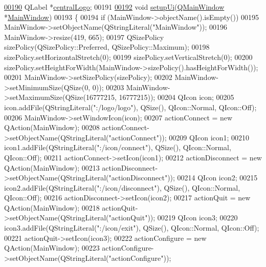 \begin{DoxyCode}
\hypertarget{a00052_source_l00190}{}\hyperlink{a00027_ab5c037236f041a2a7753d3e4efd3d0e8}{00190}     QLabel *\hyperlink{a00027_ab5c037236f041a2a7753d3e4efd3d0e8}{centralLogo};
00191 
\hypertarget{a00052_source_l00192}{}\hyperlink{a00027_acf4a0872c4c77d8f43a2ec66ed849b58}{00192}     \textcolor{keywordtype}{void} \hyperlink{a00027_acf4a0872c4c77d8f43a2ec66ed849b58}{setupUi}(\hyperlink{a00010}{QMainWindow} *\hyperlink{a00006}{MainWindow})
00193     \{
00194         \textcolor{keywordflow}{if} (MainWindow->objectName().isEmpty())
00195             MainWindow->setObjectName(QStringLiteral(\textcolor{stringliteral}{"MainWindow"}));
00196         MainWindow->resize(419, 665);
00197         QSizePolicy sizePolicy(QSizePolicy::Preferred, QSizePolicy::Maximum);
00198         sizePolicy.setHorizontalStretch(0);
00199         sizePolicy.setVerticalStretch(0);
00200         sizePolicy.setHeightForWidth(MainWindow->sizePolicy().hasHeightForWidth());
00201         MainWindow->setSizePolicy(sizePolicy);
00202         MainWindow->setMinimumSize(QSize(0, 0));
00203         MainWindow->setMaximumSize(QSize(16777215, 16777215));
00204         QIcon icon;
00205         icon.addFile(QStringLiteral(\textcolor{stringliteral}{":/logo/logo"}), QSize(), QIcon::Normal, QIcon::Off);
00206         MainWindow->setWindowIcon(icon);
00207         actionConnect = \textcolor{keyword}{new} QAction(MainWindow);
00208         actionConnect->setObjectName(QStringLiteral(\textcolor{stringliteral}{"actionConnect"}));
00209         QIcon icon1;
00210         icon1.addFile(QStringLiteral(\textcolor{stringliteral}{":/icon/connect"}), QSize(), QIcon::Normal, QIcon::Off);
00211         actionConnect->setIcon(icon1);
00212         actionDisconnect = \textcolor{keyword}{new} QAction(MainWindow);
00213         actionDisconnect->setObjectName(QStringLiteral(\textcolor{stringliteral}{"actionDisconnect"}));
00214         QIcon icon2;
00215         icon2.addFile(QStringLiteral(\textcolor{stringliteral}{":/icon/disconnect"}), QSize(), QIcon::Normal, QIcon::Off);
00216         actionDisconnect->setIcon(icon2);
00217         actionQuit = \textcolor{keyword}{new} QAction(MainWindow);
00218         actionQuit->setObjectName(QStringLiteral(\textcolor{stringliteral}{"actionQuit"}));
00219         QIcon icon3;
00220         icon3.addFile(QStringLiteral(\textcolor{stringliteral}{":/icon/exit"}), QSize(), QIcon::Normal, QIcon::Off);
00221         actionQuit->setIcon(icon3);
00222         actionConfigure = \textcolor{keyword}{new} QAction(MainWindow);
00223         actionConfigure->setObjectName(QStringLiteral(\textcolor{stringliteral}{"actionConfigure"}));

\end{DoxyCode}
